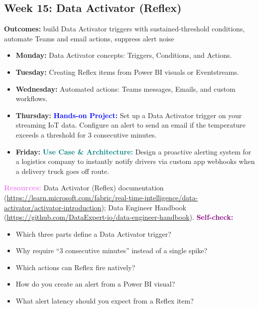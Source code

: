 \documentclass[11pt, a4paper]{article}
\newcommand{\project}[1]{\vspace{1mm}\noindent\textbf{\textcolor{blue}{Hands-on Project:}} #1}
\newcommand{\usecase}[1]{\vspace{1mm}\noindent\textbf{\textcolor{teal}{Use Case \& Architecture:}} #1}
\newcommand{\dayitem}[2]{\item \textbf{#1:} #2}
\newcommand{\resources}[1]{\vspace{1mm}\noindent\textbf{\textcolor{violet}{Resources:}} #1}
\newcommand{\selfcheck}[1]{\vspace{1mm}\noindent\textbf{\textcolor{purple}{Self-check:}} #1}
\begin{document}
\subsection*{Week 15: Data Activator (Reflex)}
\par\noindent\textbf{Outcomes:} build Data Activator triggers with sustained-threshold conditions, automate Teams and email actions, suppress alert noise
\begin{itemize}[label=-]
    \dayitem{Monday}{Data Activator concepts: Triggers, Conditions, and Actions.}
    \dayitem{Tuesday}{Creating Reflex items from Power BI visuals or Eventstreams.}
    \dayitem{Wednesday}{Automated actions: Teams messages, Emails, and custom workflows.}
    \dayitem{Thursday}{\project{Set up a Data Activator trigger on your streaming IoT data. Configure an alert to send an email if the temperature exceeds a threshold for 3 consecutive minutes.}}
    \dayitem{Friday}{\usecase{Design a proactive alerting system for a logistics company to instantly notify drivers via custom app webhooks when a delivery truck goes off route.}}
\end{itemize}
\resources{Data Activator (Reflex) documentation (\url{https://learn.microsoft.com/fabric/real-time-intelligence/data-activator/activator-introduction}); Data Engineer Handbook (\url{https://github.com/DataExpert-io/data-engineer-handbook}).}
\selfcheck{
\begin{itemize}[label=$\bullet$, leftmargin=6mm, itemsep=0pt]
    \item Which three parts define a Data Activator trigger?
    \item Why require ``3 consecutive minutes'' instead of a single spike?
    \item Which actions can Reflex fire natively?
    \item How do you create an alert from a Power BI visual?
    \item What alert latency should you expect from a Reflex item?
\end{itemize}
}
\end{document}
